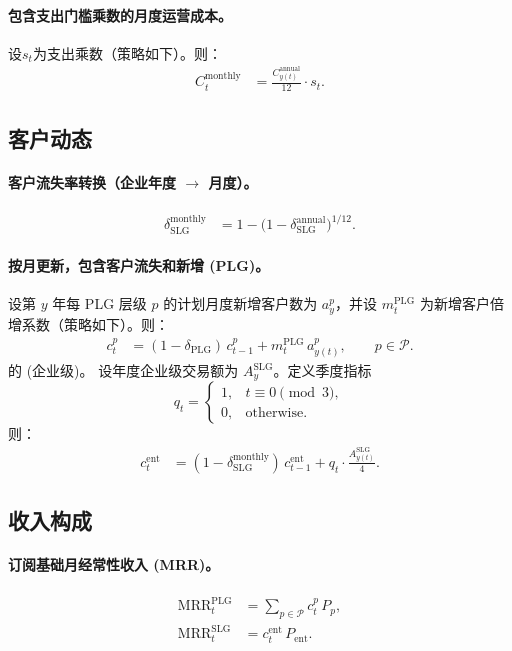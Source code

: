 \documentclass[11点, A4纸, 单面]{article}
\begin{document}
\paragraph{包含支出门槛乘数的月度运营成本。}
设$s_t$为支出乘数（策略如下）。则：
\begin{align}
C^{\mathrm{monthly}}_t 
  &= \frac{C^{\mathrm{annual}}_{y(t)}}{12} \cdot s_t.
\end{align}

\subsection{客户动态}
\paragraph{客户流失率转换（企业年度 $\to$ 月度）。}
\begin{align}
\delta^{\mathrm{monthly}}_{\mathrm{SLG}} 
  &= 1 - \bigl(1 - \delta^{\mathrm{annual}}_{\mathrm{SLG}}\bigr)^{1/12}.
\end{align}

\paragraph{按月更新，包含客户流失和新增 (PLG)。}
设第 $y$ 年每 PLG 层级 $p$ 的计划月度新增客户数为 $a^p_y$，并设 $m^{\mathrm{PLG}}_t$ 为新增客户倍增系数（策略如下）。则：
\begin{align}
c^p_t 
  &= (1-\delta_{\mathrm{PLG}})\, c^p_{t-1} + m^{\mathrm{PLG}}_t \, a^p_{y(t)}, 
  \qquad p \in \mathcal{P}.
\end{align}
的 (企业级)。
设年度企业级交易额为 $A^{\mathrm{SLG}}_{y}$。定义季度指标
\[
q_t = 
\begin{cases}
1, & t \equiv 0 \pmod{3},\\
0, & \text{otherwise}.
\end{cases}
\]
则：
\begin{align}
c^{\mathrm{ent}}_t 
  &= (1-\delta^{\mathrm{monthly}}_{\mathrm{SLG}})\, c^{\mathrm{ent}}_{t-1}
     + q_t \cdot \frac{A^{\mathrm{SLG}}_{y(t)}}{4}.
\end{align}

\subsection{收入构成}
\paragraph{订阅基础月经常性收入 (MRR)。}
\begin{align}
\mathrm{MRR}^{\mathrm{PLG}}_t &= \sum_{p \in \mathcal{P}} c^p_t \, P_p,\\
\mathrm{MRR}^{\mathrm{SLG}}_t &= c^{\mathrm{ent}}_t \, P_{\mathrm{ent}}.
\end{align}
\end{document}
